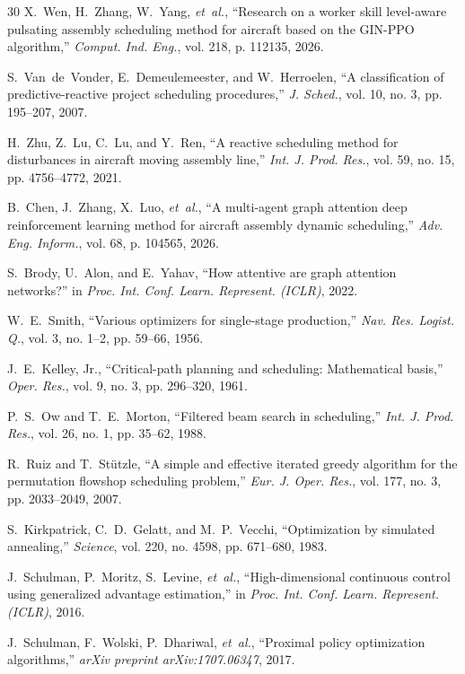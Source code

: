\documentclass[journal,10pt]{IEEEtran}
\begin{document}
\begin{thebibliography}{30}
X.~Wen, H.~Zhang, W.~Yang, \textit{et~al.}, ``Research on a worker skill level-aware pulsating assembly scheduling method for aircraft based on the GIN-PPO algorithm,'' \textit{Comput. Ind. Eng.}, vol. 218, p. 112135, 2026.

S.~Van~de~Vonder, E.~Demeulemeester, and W.~Herroelen, ``A classification of predictive-reactive project scheduling procedures,'' \textit{J. Sched.}, vol. 10, no. 3, pp. 195--207, 2007.

H.~Zhu, Z.~Lu, C.~Lu, and Y.~Ren, ``A reactive scheduling method for disturbances in aircraft moving assembly line,'' \textit{Int. J. Prod. Res.}, vol. 59, no. 15, pp. 4756--4772, 2021.

B.~Chen, J.~Zhang, X.~Luo, \textit{et~al.}, ``A multi-agent graph attention deep reinforcement learning method for aircraft assembly dynamic scheduling,'' \textit{Adv. Eng. Inform.}, vol. 68, p. 104565, 2026.

S.~Brody, U.~Alon, and E.~Yahav, ``How attentive are graph attention networks?'' in \textit{Proc. Int. Conf. Learn. Represent. (ICLR)}, 2022.

W.~E.~Smith, ``Various optimizers for single-stage production,'' \textit{Nav. Res. Logist. Q.}, vol. 3, no. 1--2, pp. 59--66, 1956.

J.~E.~Kelley, Jr., ``Critical-path planning and scheduling: Mathematical basis,'' \textit{Oper. Res.}, vol. 9, no. 3, pp. 296--320, 1961.

P.~S.~Ow and T.~E.~Morton, ``Filtered beam search in scheduling,'' \textit{Int. J. Prod. Res.}, vol. 26, no. 1, pp. 35--62, 1988.

R.~Ruiz and T.~St\"utzle, ``A simple and effective iterated greedy algorithm for the permutation flowshop scheduling problem,'' \textit{Eur. J. Oper. Res.}, vol. 177, no. 3, pp. 2033--2049, 2007.

S.~Kirkpatrick, C.~D.~Gelatt, and M.~P.~Vecchi, ``Optimization by simulated annealing,'' \textit{Science}, vol. 220, no. 4598, pp. 671--680, 1983.

J.~Schulman, P.~Moritz, S.~Levine, \textit{et~al.}, ``High-dimensional continuous control using generalized advantage estimation,'' in \textit{Proc. Int. Conf. Learn. Represent. (ICLR)}, 2016.

J.~Schulman, F.~Wolski, P.~Dhariwal, \textit{et~al.}, ``Proximal policy optimization algorithms,'' \textit{arXiv preprint arXiv:1707.06347}, 2017.
\end{thebibliography}
\end{document}
